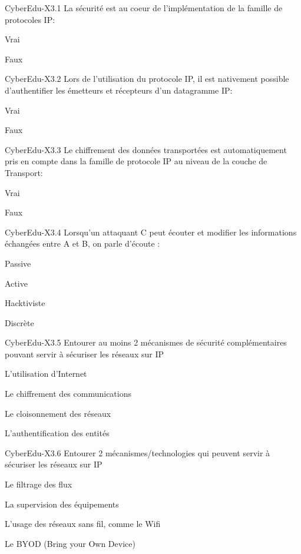 

\begin{multi}[multiple=true]{CyberEdu-X3.1}
	La sécurité est au coeur de l'implémentation de la famille de protocoles IP:
\item Vrai
\item* Faux
\end{multi}
\begin{multi}[multiple=true]{CyberEdu-X3.2}
	Lors de l'utilisation du protocole IP, il est nativement possible d'authentifier les émetteurs et récepteurs d'un datagramme IP:
\item Vrai
\item* Faux
\end{multi}
\begin{multi}[multiple=true]{CyberEdu-X3.3}
	Le chiffrement des données transportées est automatiquement pris en compte dans la famille de protocole IP au niveau de la couche de Transport:
\item Vrai
\item* Faux
\end{multi}
\begin{multi}[multiple=true]{CyberEdu-X3.4}
	Lorsqu'un attaquant C peut écouter et modifier les informations échangées entre A et B, on parle d'écoute  :
\item Passive
\item* Active
\item Hacktiviste
\item Discrète
\end{multi}
\begin{multi}[multiple=true]{CyberEdu-X3.5}
	Entourer au moins 2 mécanismes de sécurité complémentaires pouvant servir à sécuriser les réseaux sur IP
\item L'utilisation d'Internet
\item* Le chiffrement des communications
\item* Le cloisonnement des réseaux
\item* L'authentification des entités
\end{multi}
\begin{multi}[multiple=true]{CyberEdu-X3.6}
	Entourer 2 mécanismes/technologies qui peuvent servir à sécuriser les réseaux sur IP
\item* Le filtrage des flux
\item* La supervision des équipements
\item L'usage des réseaux sans fil, comme le Wifi
\item Le BYOD (Bring your Own Device)
\end{multi}
